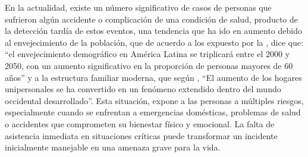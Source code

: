 
\cite{alpha_cephei_vosk_2024}
\cite{apple_use_2023}
\cite{asamblea_nacional_constituyente_constitucion_1999}
\cite{bobadilla_cadenas_2010}
\cite{boehm_spiral_1988}
\cite{carmona_enchufe_2024}
\cite{covenin_norma_2005}
\cite{dolui_comparison_2017}
\cite{dubs_estrategia_2004}
\cite{garcia_ciencia_2018}
\cite{goldsborough_tour_2016}
\cite{hernandez_metodologia_2014}
\cite{hurtado_metodologia_2000}
\cite{hyndman_forecasting_2018}
\cite{igba_analysing_2016}
\cite{kaggle_yamnet_2024}
\cite{malmberg_real-time_2021}
\cite{matas_introduccion_2024}
\cite{medina_edge_2019}
\cite{mondragon_clasificacion_2021}
\cite{naciones_unidas_envejecimiento_2022}
\cite{naciones_unidas_transformar_2015}
\cite{pressman_ingenieria_2010}
\cite{provost_data_2013}
\cite{ralla_hallan_2024}
\cite{republica_bolivariana_venezuela_ley_2001}
\cite{republica_bolivariana_venezuela_ley_mensajes_2001}
\cite{republica_bolivariana_venezuela_ley_organica_2010}
\cite{richardson_getting_2016}
\cite{russell_artificial_2022}
\cite{sabo_nestjs_2020}
\cite{shi_edge_2016}
\cite{tamayo_proceso_2004}
\cite{torija_metodologia_2018}
\cite{upel_manual_2004}
\cite{upton_raspberry_2020}
\cite{yuill_python_2006}


En la actualidad, existe un número significativo de casos de personas que sufrieron algún accidente o complicación de una condición de salud, producto de la detección tardía de estos eventos, una tendencia que ha ido en aumento debido al envejecimiento de la población, que de acuerdo a los expuesto por la \citeauthor{cepal_2005} \citeyear{cepal_2005}, dice que: “el envejecimiento demográfico en América Latina se triplicará entre el 2000 y 2050, con un aumento significativo en la proporción de personas mayores de 60 años” y a la estructura familiar moderna, que según \cite{pena2016reciente}, ``El aumento de los hogares unipersonales se ha convertido en un fenómeno extendido dentro del mundo occidental desarrollado''. Esta situación, expone a las personas a múltiples riesgos, especialmente cuando se enfrentan a emergencias domésticas, problemas de salud o accidentes que comprometen su bienestar físico y emocional. La falta de asistencia inmediata en situaciones críticas puede transformar un incidente inicialmente manejable en una amenaza grave para la vida.


